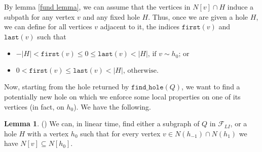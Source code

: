 \documentclass{article}
\theoremstyle{definition}
\newtheorem{lemma}[thm]{Lemma}
\begin{document}
    By lemma \ref{fund lemma},
    we can assume that
    the vertices in $N\left[v\right] \cap H$
    induce a subpath for any vertex
    $v$ and any fixed hole $H$.
    Thus, once we are given
    a hole $H$, we can
    define for all vertices
    $v$ adjacent to it,
    the indices $\texttt{first}\left(v\right)$
    and $\texttt{last}\left(v\right)$
    such that 
    \begin{itemize}
        \item $-\left|H\right| < \texttt{first}\left(v\right)
            \leq 0 \leq \texttt{last}\left(v\right) < \left|H\right|
            \text{, if } v \sim h_{0}\text{; or}$ 
        \item $0 < \texttt{first}\left(v\right) 
            \leq \texttt{last}\left(v\right) < \left|H\right|
            \text{, otherwise.}$
    \end{itemize}
    
    Now, starting from 
    the hole returned
    by $\texttt{find\_hole}\left(Q\right)$, we
    want to find a potentially new hole
    on which we
    enforce some local
    properties on one of its 
    vertices (in fact, on $h_0$).
    We have the following.

    \begin{lemma} (\cite{main}) \label{hole lemma}
        We can, in linear time,
        find either a subgraph
        of $Q$ in $\mathcal{F}_{LI}$, 
        or a hole $H$ with
        a vertex $h_0$ such that
        for every vertex $v \in N\left(h_{-1}\right) \cap  N\left(h_{1}\right)$
        we have
        $N\left[v\right] \subseteq N\left[h_0\right]$.
    \end{lemma}
    
\end{document}
